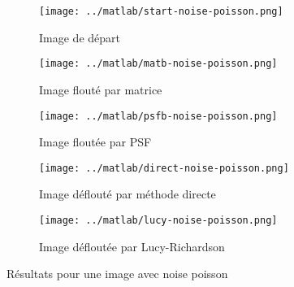 \documentclass{article}
\begin{document}
\begin{figure}[!ht]
  \centering
  \begin{subfigure}[b]{0.45\textwidth}
    \texttt{[image: ../matlab/start-noise-poisson.png]}
    \caption{Image de départ}
    \label{fig:start-noise-poisson}
  \end{subfigure}
  \begin{subfigure}[b]{0.45\textwidth}
    \texttt{[image: ../matlab/matb-noise-poisson.png]}
    \caption{Image flouté par matrice}
    \label{fig:matb-noise-poisson}
  \end{subfigure}%
  \begin{subfigure}[b]{0.45\textwidth}
    \texttt{[image: ../matlab/psfb-noise-poisson.png]}
    \caption{Image floutée par PSF}
    \label{fig:psfb-noise-poisson_explicite_lambda}
  \end{subfigure}
  \begin{subfigure}[b]{0.45\textwidth}
    \texttt{[image: ../matlab/direct-noise-poisson.png]}
    \caption{Image déflouté par méthode directe}
    \label{fig:direct-noise-poisson}
  \end{subfigure}
  \begin{subfigure}[b]{0.45\textwidth}
    \texttt{[image: ../matlab/lucy-noise-poisson.png]}
    \caption{Image défloutée par Lucy-Richardson}
    \label{fig:lucy-noise-poisson}
  \end{subfigure}
  \caption{Résultats pour une image avec noise poisson}
  \label{fig:noise-poisson}
\end{figure}



\end{document}
